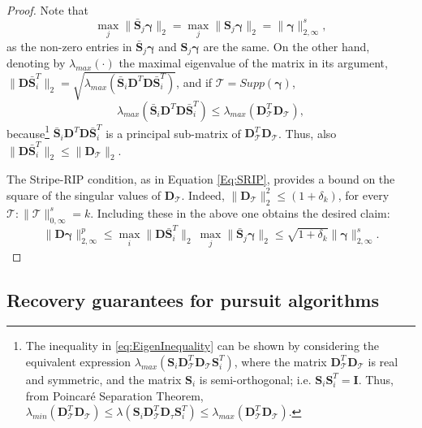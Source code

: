 \documentclass[10pt,journal]{IEEEtran}
\def\D{{\mathbf D}}
\def\gama{{\boldsymbol \gamma}}
\theoremstyle{plain}
\theoremstyle{definition}
\begin{document}
\begin{proof}
	Note that 
	\begin{equation}
	\underset{j}{\max} \| \bar{\mathbf{S}}_j \gama\|_2 = \underset{j}{\max} \| \mathbf{S}_j \gama\|_2 = \| \gama\|^s_{2,\infty},
	\end{equation}
	as the non-zero entries in $\bar{\mathbf{S}}_j \gama$ and $\mathbf{S}_j \gama$ are the same. On the other hand, denoting by $\lambda_{max}(\cdot)$ the maximal eigenvalue of the matrix in its argument, $\| \D\bar{\mathbf{S}}_i^T \|_2 = \sqrt{\lambda_{max}\left( \bar{\mathbf{S}}_i \D^T\D \bar{\mathbf{S}}_i^T \right)}$, and if $\mathcal{T} = Supp(\gama)$,
	\begin{equation} \label{eq:EigenInequality}
	\lambda_{max}\left( \bar{\mathbf{S}}_i \D^T\D \bar{\mathbf{S}}_i^T \right) \leq \lambda_{max}\left( \D_\mathcal{T}^T\D_\mathcal{T} \right),
	\end{equation}
	because\footnote{The inequality in \eqref{eq:EigenInequality} can be shown by considering the equivalent expression $\lambda_{max}\left( \mathbf{S}_i\D^T_\mathcal{T}\D_\mathcal{T}\mathbf{S}^T_i\right)$, where the matrix $\D^T_\mathcal{T}\D_\mathcal{T}$ is real and symmetric, and the matrix $\mathbf{S}_i$ is semi-orthogonal; i.e. $\mathbf{S}_i \mathbf{S}^T_i = \mathbf{I}$. Thus, from Poincar\'e Separation Theorem, $\lambda_{min}\left( \D^T_\mathcal{T}\D_\mathcal{T} \right) \leq \lambda\left( \mathbf{S}_i\D^T_\mathcal{T}\D_\tau\mathbf{S}^T_i\right) \leq \lambda_{max}\left( \D^T_\mathcal{T}\D_\mathcal{T} \right)$.} $ \bar{\mathbf{S}}_i \D^T\D \bar{\mathbf{S}}_i^T $ is a principal sub-matrix of $\D_\mathcal{T}^T\D_\mathcal{T}$. Thus, also $\|\D\bar{\mathbf{S}}^T_i\|_2 \leq \| \D_\mathcal{T}\|_2$. 
	
	The Stripe-RIP condition, as in Equation \eqref{Eq:SRIP}, provides a bound on the square of the singular values of $\D_\mathcal{T}$. Indeed, $\| \D_\mathcal{T} \|^2_2 \leq (1+\delta_k)$, for every $\mathcal{T} : \|\mathcal{T}\|^s_{0,\infty} = k$. Including these in the above one obtains the desired claim:
	\begin{equation}
	\|\D\gama\|^p_{2,\infty}  \leq \underset{i}{\max} \| \D\bar{\mathbf{S}}_i^T \|_2 \ \underset{j}{\max} \| \bar{\mathbf{S}}_j \gama\|_2 \leq \sqrt{1+\delta_k} \| \gama \|^s_{2,\infty}.
	\end{equation}
\end{proof}


\subsection{Recovery guarantees for pursuit algorithms}
\end{document}
